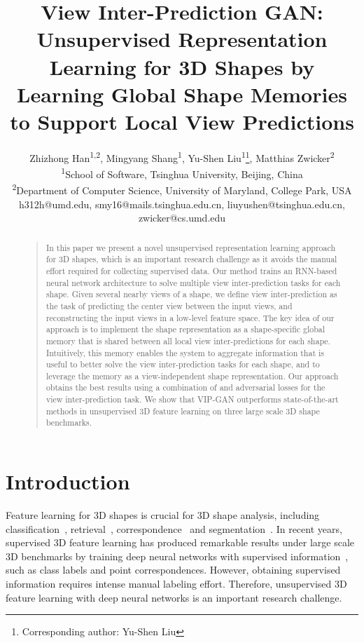 \documentclass[letterpaper]{article} \usepackage{aaai19}  \usepackage{times}  \usepackage{helvet}  \usepackage{courier}  \usepackage{url}  \usepackage{graphicx}
\begin{document}
\title{View Inter-Prediction GAN: Unsupervised Representation Learning for 3D Shapes by Learning Global Shape Memories to Support Local View Predictions}
\author{Zhizhong Han\textsuperscript{1,2},
Mingyang Shang\textsuperscript{1},
Yu-Shen Liu\textsuperscript{1}\thanks{Corresponding author: Yu-Shen Liu},
Matthias Zwicker\textsuperscript{2}\\
\textsuperscript{1}{School of Software, Tsinghua University, Beijing, China}\\
\textsuperscript{2}{Department of Computer Science, University of Maryland, College Park, USA}\\
h312h@umd.edu,
smy16@mails.tsinghua.edu.cn,
liuyushen@tsinghua.edu.cn,
zwicker@cs.umd.edu
}
\maketitle
\begin{abstract}
\begin{quote}
In this paper we present a novel unsupervised representation learning approach for 3D shapes, which is an important research challenge as it avoids the manual effort required for collecting supervised data. Our method trains an RNN-based neural network architecture to solve multiple view inter-prediction tasks for each shape. Given several nearby views of a shape, we define view inter-prediction as the task of predicting the center view between the input views, and reconstructing the input views in a low-level feature space. The key idea of our approach is to implement the shape representation  as a shape-specific global memory that is shared between all local view inter-predictions for each shape. Intuitively, this memory enables the system to aggregate information that is useful to better solve the view inter-prediction tasks for each shape, and to leverage the memory as a view-independent shape representation. Our approach obtains the best results using a combination of  and adversarial losses for the view inter-prediction task. We show that VIP-GAN outperforms state-of-the-art methods in unsupervised 3D feature learning on three large scale 3D shape benchmarks.
\end{quote}
\end{abstract}


\section{Introduction}
Feature learning for 3D shapes is crucial for 3D shape analysis, including classification~\cite{Sharma16,WuNIPS2016,Zhizhong2016b,YaoqingCVPR2018,PanosCVPR2018ICML,HanTIP18}, retrieval~\cite{Sharma16,WuNIPS2016,Zhizhong2016b,YaoqingCVPR2018,PanosCVPR2018ICML,HanTIP18}, correspondence~\cite{Zhizhong2016b,HanTIP18} and segmentation~\cite{cvprpoint2017,nipspoint17}. In recent years, supervised 3D feature learning has produced remarkable results under large scale 3D benchmarks by training deep neural networks with supervised information~\cite{cvprpoint2017,nipspoint17}, such as class labels and point correspondences. However, obtaining supervised information requires intense manual labeling effort.
Therefore, unsupervised 3D feature learning with deep neural networks is an important research challenge.
\end{document}
